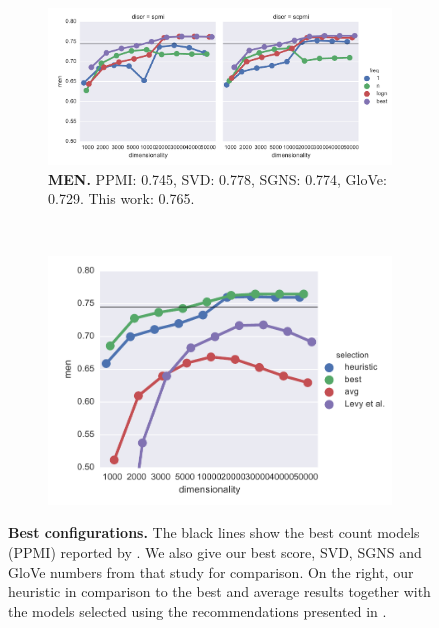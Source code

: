 \begin{figure}
  \begin{subfigure}[t]{0.6\textwidth}
    \includegraphics[width=\textwidth]{supplement/figures/men-best}
    \caption{\small \textbf{MEN.}
      PPMI: 0.745,
      SVD: 0.778,
      SGNS: 0.774,
      GloVe: 0.729.
      This work: 0.765.
    }
    \label{fig:best-men}
  \end{subfigure}
  ~
  \begin{subfigure}[t]{0.37\textwidth}
    \includegraphics[width=\textwidth]{supplement/figures/men-global-best}
    \caption{}
    \label{fig:global-best-men}
  \end{subfigure}

  \caption{\small\textbf{Best configurations.} The black lines show the best count models (PPMI) reported by \protect{}. We also give our best score, SVD, SGNS and GloVe numbers from that study for comparison. On the right, our heuristic in comparison to the best and average results together with the models selected using the recommendations presented in \protect{}.}
  \label{fig:best}
\end{figure}

